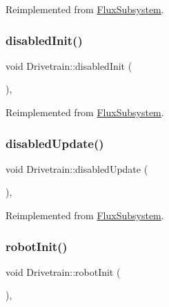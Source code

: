 Reimplemented from \hyperlink{classFluxSubsystem_aceed900af22503022b8d1278f3693f77}{Flux\+Subsystem}.

\mbox{\label{classDrivetrain_ac6fe041de609bdb45eac65282fbdf507}} 
\subsubsection{\texorpdfstring{disabled\+Init()}{disabledInit()}}
{\footnotesize\ttfamily void Drivetrain\+::disabled\+Init (\begin{DoxyParamCaption}{ }\end{DoxyParamCaption})\hspace{0.3cm}{\ttfamily [override]}, {\ttfamily [virtual]}}



Reimplemented from \hyperlink{classFluxSubsystem_aa0b8fde8aa5094627d15d24e545e1da4}{Flux\+Subsystem}.

\mbox{\label{classDrivetrain_a46aa479a25757868bfda71081ec7baa2}} 
\subsubsection{\texorpdfstring{disabled\+Update()}{disabledUpdate()}}
{\footnotesize\ttfamily void Drivetrain\+::disabled\+Update (\begin{DoxyParamCaption}{ }\end{DoxyParamCaption})\hspace{0.3cm}{\ttfamily [override]}, {\ttfamily [virtual]}}



Reimplemented from \hyperlink{classFluxSubsystem_a5c39cb0f0834cc77a2b8f4f47778da87}{Flux\+Subsystem}.

\mbox{\label{classDrivetrain_a7e9c10a27b3cc5ad89f2338de39b7c62}} 
\subsubsection{\texorpdfstring{robot\+Init()}{robotInit()}}
{\footnotesize\ttfamily void Drivetrain\+::robot\+Init (\begin{DoxyParamCaption}{ }\end{DoxyParamCaption})\hspace{0.3cm}{\ttfamily [override]}, {\ttfamily [virtual]}}



